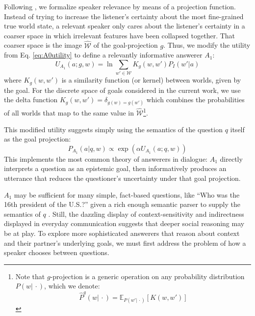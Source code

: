 \documentclass[12pt, floatsintext, jou]{apa6}
\newcommand{\E}[2]{\ensuremath{\mathbb{E}_{#1}\left [#2 \right]}}
\begin{document}
Following , we formalize speaker relevance by means of a projection function. Instead of trying to increase the listener's certainty about the most fine-grained true world state, a relevant speaker only cares about the listener's certainty in a coarser space in which irrelevant features have been collapsed together. That coarser space is the image $\widehat{\mathcal{W}}$ of the goal-projection $g$.
Thus, we modify the utility from Eq. \ref{eq:A0utility} to define a relevantly informative answerer $A_1$: 
\begin{equation}
U_{A_1}(a; g, w) = \ln \sum_{w' \in \mathcal{W}} K_g(w, w') P_I(w' | a)
\end{equation}
where $K_g(w,w')$ is a similarity function (or kernel) between worlds, given by the goal. For the discrete space of goals considered in the current work, we use the delta function $K_g(w,w') = \delta_{g(w)=g(w')}$ which combines the probabilities of all worlds that map to the same value in $\widehat{\mathcal{W}}$\footnote{Note that $g$-projection is a generic operation on any probability distribution $P(w|\,\cdot)$, which we denote: 
$$\widehat{P}^g(w|\, \cdot) = \E{P(w'|\, \cdot)}{K(w,w')}$$
}.

This modified utility suggests simply using the semantics of the question $q$ itself as the goal projection:
$$P_{A_1}(a|q,w) \propto \exp(\alpha U_{A_1}(a; q,w))$$
This implements the most common theory of answerers in dialogue: $A_1$ directly interprets a question as an epistemic goal, then informatively produces an utterance that reduces the questioner's uncertainty under that goal projection. 

$A_1$ may be sufficient for many simple, fact-based questions, like ``Who was the 16th president of the U.S.?'' given a rich enough semantic parser to supply the semantics of $q$ \cite{BerantChouFrostigLiang13_FreebaseQAPairs}. Still, the dazzling display of context-sensitivity and indirectness displayed in everyday communication suggests that deeper social reasoning may be at play. To explore more sophisticated answerers that reason about context and their partner's underlying goals, we must first address the problem of how a speaker chooses between questions.
\end{document}
